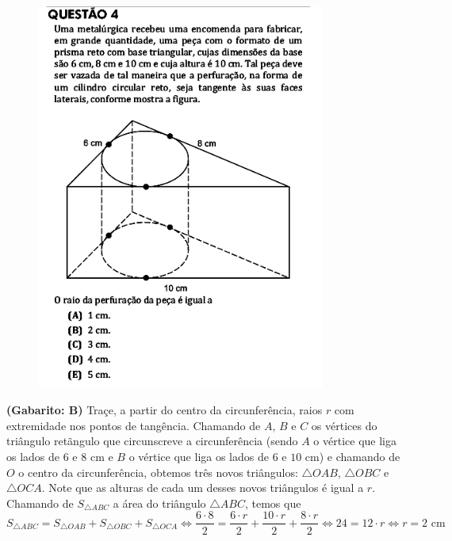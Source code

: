 \documentclass[a4paper]{article}
\begin{document}
\begin{figure}[H]
	\begin{center}
		\includegraphics[width=9.5cm]{L5Q4.png}
	\end{center}
\end{figure}
\par\textbf{(Gabarito: B)} Traçe, a partir do centro da circunferência, raios $r$ com extremidade nos pontos de tangência. Chamando de $A$, $B$ e $C$ os vértices do triângulo retãngulo que circunscreve a circunferência (sendo $A$ o vértice que liga os lados de $6$ e $8$ cm e $B$ o vértice que liga os lados de $6$ e $10$ cm) e chamando de $O$ o centro da circunferência, obtemos três novos triângulos: $\triangle OAB$, $\triangle OBC$ e $\triangle OCA$. Note que as alturas de cada um desses novos triângulos é igual a $r$. Chamando de $S_{\triangle ABC}$ a área do triângulo $\triangle ABC$, temos que
\begin{equation*}
S_{\triangle ABC} = S_{\triangle OAB} + S_{\triangle OBC} + S_{\triangle OCA} \iff \frac{6\cdot 8}{2} = \frac{6\cdot r}{2} + \frac{10\cdot r}{2} + \frac{8\cdot r}{2} \iff 24 = 12\cdot r \iff r = 2\text{ cm}
\end{equation*}
\end{document}
